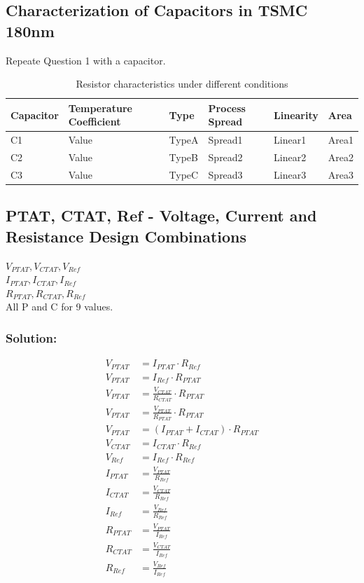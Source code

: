 \documentclass[a4paper]{article}
\begin{document}
\subsection{Characterization of Capacitors in TSMC 180nm}
Repeate Question 1 with a capacitor. 
\begin{table}[ht]
\centering
\begin{tabular}{|l|l|l|l|l|l|}
\hline
Capacitor & Temperature Coefficient & Type & Process Spread & Linearity & Area \\
\hline
C1 & Value & TypeA & Spread1 & Linear1 & Area1 \\
C2 & Value & TypeB & Spread2 & Linear2 & Area2 \\
C3 & Value & TypeC & Spread3 & Linear3 & Area3 \\
\hline
\end{tabular}
\caption{Resistor characteristics under different conditions}
\end{table}

\subsection{PTAT, CTAT, Ref - Voltage, Current and Resistance Design Combinations}
$V_{PTAT}, V_{CTAT}, V_{Ref}$\\ $I_{PTAT}, I_{CTAT}, I_{Ref}$\\ $R_{PTAT}, R_{CTAT}, R_{Ref}$\\
All P and C for 9 values. \\
\subsubsection*{Solution:}
\begin{align*}
V_{PTAT} &= I_{PTAT} \cdot R_{Ref} \\
V_{PTAT} &= I_{Ref} \cdot R_{PTAT} \\
V_{PTAT} &= \frac{V_{CTAT}}{R_{CTAT}}\cdot R_{PTAT} \\
V_{PTAT} &= \frac{V_{PTAT}}{R_{PTAT}}\cdot R_{PTAT} \\
V_{PTAT} &= (I_{PTAT} + I_{CTAT}) \cdot R_{PTAT} \\
V_{CTAT} &= I_{CTAT} \cdot R_{Ref} \\
V_{Ref} &= I_{Ref} \cdot R_{Ref} \\
I_{PTAT} &= \frac{V_{PTAT}}{R_{Ref}} \\
I_{CTAT} &= \frac{V_{CTAT}}{R_{Ref}} \\
I_{Ref} &= \frac{V_{Ref}}{R_{Ref}} \\
R_{PTAT} &= \frac{V_{PTAT}}{I_{Ref}} \\
R_{CTAT} &= \frac{V_{CTAT}}{I_{Ref}} \\
R_{Ref} &= \frac{V_{Ref}}{I_{Ref}} \\
\end{align*}
\end{document}
